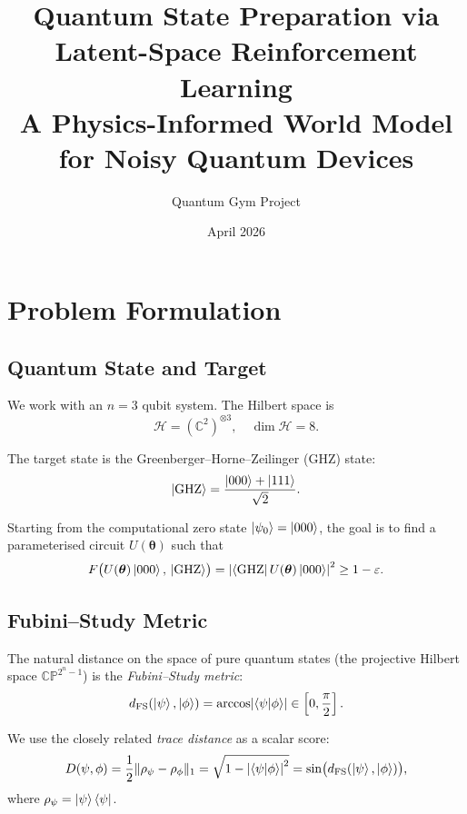\documentclass[11pt,a4paper]{article}
\title{\textbf{Quantum State Preparation via Latent-Space Reinforcement Learning}\\
\large A Physics-Informed World Model for Noisy Quantum Devices}
\author{Quantum Gym Project}
\date{April 2026}
\begin{document}
\maketitle
\tableofcontents
\newpage

\section{Problem Formulation}

\subsection{Quantum State and Target}

We work with an $n=3$ qubit system. The Hilbert space is
\begin{equation}
    \mathcal{H} = \left(\mathbb{C}^2\right)^{\otimes 3}, \quad \dim \mathcal{H} = 8.
\end{equation}

The target state is the Greenberger--Horne--Zeilinger (GHZ) state:
\begin{equation}
    \ket{\text{GHZ}} = \frac{\ket{000} + \ket{111}}{\sqrt{2}}.
\end{equation}

Starting from the computational zero state $\ket{\psi_0} = \ket{000}$, the goal is to
find a parameterised circuit $U(\boldsymbol{\theta})$ such that
\begin{equation}
    F\bigl(U(\boldsymbol{\theta})\ket{000},\, \ket{\text{GHZ}}\bigr)
    = \left|\bra{\text{GHZ}} U(\boldsymbol{\theta}) \ket{000}\right|^2 \geq 1 - \varepsilon.
\end{equation}

\subsection{Fubini--Study Metric}

The natural distance on the space of pure quantum states (the projective Hilbert space
$\mathbb{CP}^{2^n-1}$) is the \emph{Fubini--Study metric}:
\begin{equation}
    d_{\mathrm{FS}}(\ket{\psi}, \ket{\phi})
    = \arccos\!\left|\braket{\psi}{\phi}\right|
    \in \left[0, \frac{\pi}{2}\right].
\end{equation}

We use the closely related \emph{trace distance} as a scalar score:
\begin{equation}
    D(\psi, \phi) = \frac{1}{2}\|\rho_\psi - \rho_\phi\|_1
    = \sqrt{1 - \left|\braket{\psi}{\phi}\right|^2}
    = \sin\bigl(d_{\mathrm{FS}}(\ket{\psi},\ket{\phi})\bigr),
\end{equation}
where $\rho_\psi = \ket{\psi}\bra{\psi}$.
\end{document}

